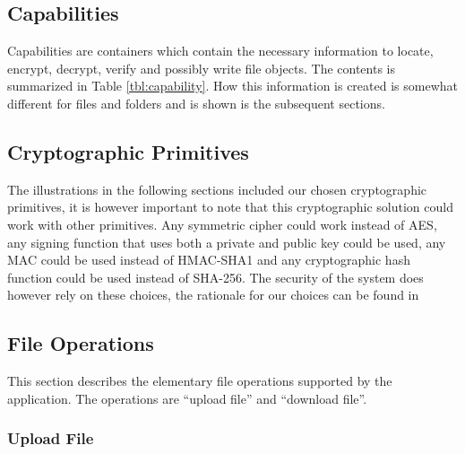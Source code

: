 \documentclass[pdftex,english,10pt,b5paper,twoside]{book}
\begin{document}
\subsection{Capabilities}

Capabilities are containers which contain the necessary information to locate,
encrypt, decrypt, verify and possibly write file objects. The contents is
summarized in Table \ref{tbl:capability}. How this information is
created is somewhat different for files and folders and is shown is the
subsequent sections. 



\subsection{Cryptographic Primitives}

The illustrations in the following sections included our chosen cryptographic
primitives, it is however important to note that this cryptographic solution
could work with other primitives. Any symmetric cipher could work instead of
\ac{AES}, any signing function that uses both a private and public key could be
used, any \ac{MAC} could be used instead of H\ac{MAC}-\ac{SHA}1 and any
cryptographic hash function could be used instead of \ac{SHA}-256. The security
of the system does however rely on these choices, the rationale for our choices
can be found in %

\subsection{File Operations}
This section describes the elementary file operations supported by the
application. The operations are ``upload file'' and ``download file''.

\subsubsection{Upload File} 
\label{sec:CS:CF} 
\end{document}
